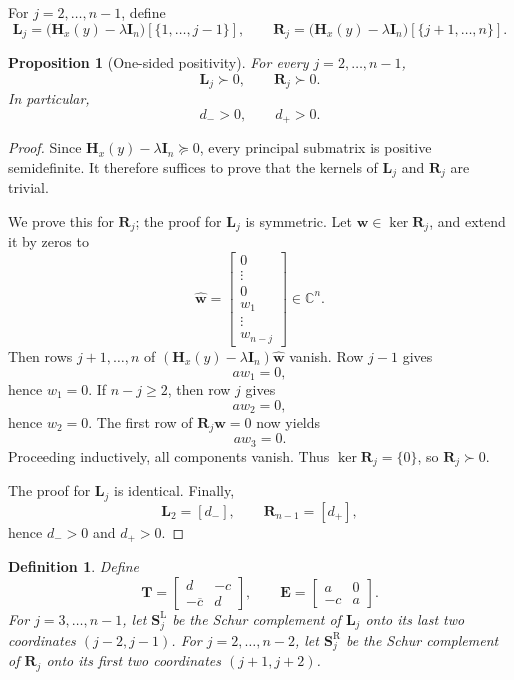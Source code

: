 \documentclass[11pt]{article}
\numberwithin{equation}{section}
\newtheorem{proposition}[theorem]{Proposition}
\newtheorem{definition}[theorem]{Definition}
\newcommand{\C}{\mathbb C}
\newcommand{\I}{\mathbf I}
\newcommand{\Hmat}{\mathbf H}
\begin{document}
For \(j=2,\dots,n-1\), define
\[
\mathbf L_j
=
\bigl(\Hmat_x(y)-\lambda\I_n\bigr)[\{1,\dots,j-1\}],
\qquad
\mathbf R_j
=
\bigl(\Hmat_x(y)-\lambda\I_n\bigr)[\{j+1,\dots,n\}].
\]

\begin{proposition}[One-sided positivity]\label{prop:onesided}
For every \(j=2,\dots,n-1\),
\[
\mathbf L_j\succ0,
\qquad
\mathbf R_j\succ0.
\]
In particular,
\[
d_->0,
\qquad
d_+>0.
\]
\end{proposition}

\begin{proof}
Since \(\Hmat_x(y)-\lambda\I_n\succeq0\), every principal submatrix is positive
semidefinite.  It therefore suffices to prove that the kernels of \(\mathbf L_j\) and
\(\mathbf R_j\) are trivial.

We prove this for \(\mathbf R_j\); the proof for \(\mathbf L_j\) is symmetric.
Let \(\bm w\in\ker\mathbf R_j\), and extend it by zeros to
\[
\widehat{\bm w}=
\begin{bmatrix}
0\\
\vdots\\
0\\
w_1\\
\vdots\\
w_{n-j}
\end{bmatrix}\in\C^n.
\]
Then rows \(j+1,\dots,n\) of
\((\Hmat_x(y)-\lambda\I_n)\widehat{\bm w}\) vanish.  Row \(j-1\) gives
\[
aw_1=0,
\]
hence \(w_1=0\).  If \(n-j\ge2\), then row \(j\) gives
\[
aw_2=0,
\]
hence \(w_2=0\).  The first row of \(\mathbf R_j\bm w=0\) now yields
\[
aw_3=0.
\]
Proceeding inductively, all components vanish.  Thus
\(\ker\mathbf R_j=\{0\}\), so \(\mathbf R_j\succ0\).

The proof for \(\mathbf L_j\) is identical.  Finally,
\[
\mathbf L_2=[d_-],
\qquad
\mathbf R_{n-1}=[d_+],
\]
hence \(d_->0\) and \(d_+>0\).
\end{proof}

\begin{definition}\label{def:edge}
Define
\[
\mathbf T=
\begin{bmatrix}
d & -c\\
-\overline c & d
\end{bmatrix},
\qquad
\mathbf E=
\begin{bmatrix}
a & 0\\
-c & a
\end{bmatrix}.
\]
For \(j=3,\dots,n-1\), let \(\mathbf S_j^{\mathrm L}\) be the Schur complement of
\(\mathbf L_j\) onto its last two coordinates \((j-2,j-1)\).  For
\(j=2,\dots,n-2\), let \(\mathbf S_j^{\mathrm R}\) be the Schur complement of
\(\mathbf R_j\) onto its first two coordinates \((j+1,j+2)\).
\end{definition}
\end{document}
